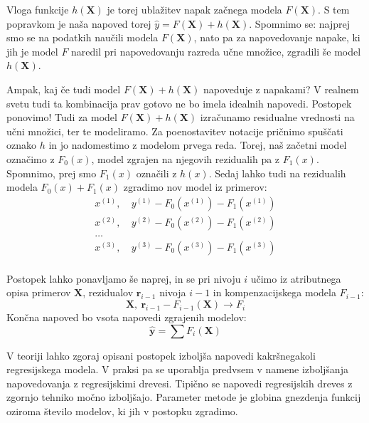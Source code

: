 Vloga funkcije $h(\bm X)$ je torej ublažitev napak začnega modela $F({\bm X})$. S tem popravkom je naša napoved torej $\hat{y}=F({\bm X})+h({\bm X})$. Spomnimo se: najprej smo se na podatkih naučili modela $F({\bm X})$, nato pa za napovedovanje napake, ki jih je model $F$ naredil pri napovedovanju razreda učne množice, zgradili še model $h({\bm X})$.

Ampak, kaj če tudi model $F({\bm X})+h({\bm X})$ napoveduje z napakami? V realnem svetu tudi ta kombinacija prav gotovo ne bo imela idealnih napovedi. Postopek ponovimo! Tudi za model $F({\bm X})+h({\bm X})$ izračunamo residualne vrednosti na učni množici, ter te modeliramo. Za poenostavitev notacije pričnimo spuščati oznako $h$ in jo nadomestimo z modelom prvega reda. Torej, naš začetni model označimo z $F_0(x)$, model zgrajen na njegovih rezidualih pa z $F_1(x)$. Spomnimo, prej smo $F_1(x)$ označili z $h(x)$. Sedaj lahko tudi na rezidualih modela $F_0(x)+F_1(x)$ zgradimo nov model iz primerov:
\begin{equation}
  \begin{split}
  x^{(1)}, &\ y^{(1)}-F_0(x^{(1)}) -F_1(x^{(1)}) \nonumber \\
  x^{(2)}, &\ y^{(2)}-F_0(x^{(2)}) -F_1(x^{(2)}) \nonumber \\
  \ldots \nonumber \\
  x^{(3)}, &\ y^{(3)}-F_0(x^{(3)}) -F_1(x^{(3)}) \nonumber \\
  \end{split}
\end{equation}

Postopek lahko ponavljamo še naprej, in se pri nivoju $i$ učimo iz atributnega opisa primerov $\bm X$, rezidualov ${\bm r}_{i-1}$ nivoja $i-1$ in kompenzacijskega modela $F_{i-1}$:
\begin{equation}
  \nonumber
  {\bm X},\ {\bm r}_{i-1}-F_{i-1}({\bm X})\rightarrow F_i
\end{equation}
Končna napoved bo vsota napovedi zgrajenih modelov:
\begin{equation}
  \nonumber
  \hat{\bm y}=\sum F_i({\bm X})
\end{equation}

V teoriji lahko zgoraj opisani postopek izboljša napovedi kakršnegakoli regresijskega modela. V praksi pa se uporablja predvsem v namene izboljšanja napovedovanja z regresijskimi drevesi. Tipično se napovedi regresijskih dreves z zgornjo tehniko močno izboljšajo. Parameter metode je globina gnezdenja funkcij oziroma število modelov, ki jih v postopku zgradimo.

